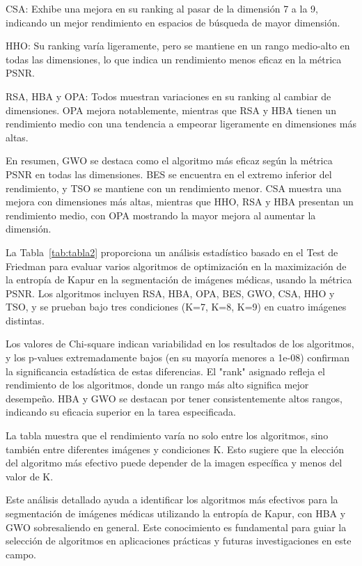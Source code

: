 \documentclass[conference]{IEEEtran}
\begin{document}
\noindent CSA: Exhibe una mejora en su ranking al pasar de la dimensión 7 a la 9, indicando un mejor rendimiento en espacios de búsqueda de mayor dimensión.

\noindent HHO: Su ranking varía ligeramente, pero se mantiene en un rango medio-alto en todas las dimensiones, lo que indica un rendimiento menos eficaz en la métrica PSNR.

\noindent RSA, HBA y OPA: Todos muestran variaciones en su ranking al cambiar de dimensiones. OPA mejora notablemente, mientras que RSA y HBA tienen un rendimiento medio con una tendencia a empeorar ligeramente en dimensiones más altas.

\noindent En resumen, GWO se destaca como el algoritmo más eficaz según la métrica PSNR en todas las dimensiones. BES se encuentra en el extremo inferior del rendimiento, y TSO se mantiene con un rendimiento menor. CSA muestra una mejora con dimensiones más altas, mientras que HHO, RSA y HBA presentan un rendimiento medio, con OPA mostrando la mayor mejora al aumentar la dimensión.



\noindent La Tabla~\ref{tab:tabla2} proporciona un análisis estadístico basado en el Test de Friedman para evaluar varios algoritmos de optimización en la maximización de la entropía de Kapur en la segmentación de imágenes médicas, usando la métrica PSNR. Los algoritmos incluyen RSA, HBA, OPA, BES, GWO, CSA, HHO y TSO, y se prueban bajo tres condiciones (K=7, K=8, K=9) en cuatro imágenes distintas.

\noindent Los valores de Chi-square indican variabilidad en los resultados de los algoritmos, y los p-values extremadamente bajos (en su mayoría menores a 1e-08) confirman la significancia estadística de estas diferencias. El "rank" asignado refleja el rendimiento de los algoritmos, donde un rango más alto significa mejor desempeño. HBA y GWO se destacan por tener consistentemente altos rangos, indicando su eficacia superior en la tarea especificada.

\noindent La tabla muestra que el rendimiento varía no solo entre los algoritmos, sino también entre diferentes imágenes y condiciones K. Esto sugiere que la elección del algoritmo más efectivo puede depender de la imagen específica y menos del valor de K.

\noindent Este análisis detallado ayuda a identificar los algoritmos más efectivos para la segmentación de imágenes médicas utilizando la entropía de Kapur, con HBA y GWO sobresaliendo en general. Este conocimiento es fundamental para guiar la selección de algoritmos en aplicaciones prácticas y futuras investigaciones en este campo.
\end{document}
